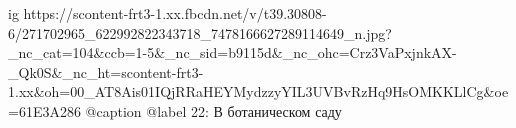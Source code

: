  
 
 
 
 

\ifcmt
  ig https://scontent-frt3-1.xx.fbcdn.net/v/t39.30808-6/271702965_622992822343718_7478166627289114649_n.jpg?_nc_cat=104&ccb=1-5&_nc_sid=b9115d&_nc_ohc=Crz3VaPxjnkAX-_Qk0S&_nc_ht=scontent-frt3-1.xx&oh=00_AT8Ais01IQjRRaHEYMydzzyYIL3UVBvRzHq9HsOMKKLlCg&oe=61E3A286
  @caption @label 22: В ботаническом саду
\fi
